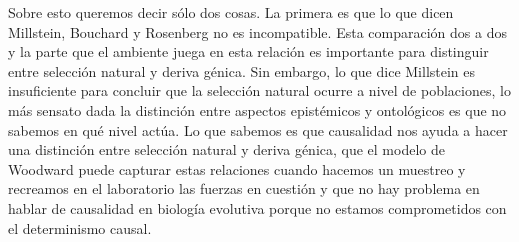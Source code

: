 Sobre esto queremos decir sólo dos cosas. La primera es que lo que dicen Millstein, Bouchard y Rosenberg no es incompatible. Esta comparación dos a dos y la parte que el ambiente juega en esta relación es importante para distinguir entre selección natural y deriva génica. Sin embargo, lo que dice Millstein es insuficiente para concluir que la selección natural ocurre a nivel de poblaciones, lo más sensato dada la distinción entre aspectos epistémicos y ontológicos es que no sabemos en qué nivel actúa. Lo que sabemos es que causalidad nos ayuda a hacer una distinción entre selección natural y deriva génica, que el modelo de Woodward puede capturar estas relaciones cuando hacemos un muestreo y recreamos en el laboratorio las fuerzas en cuestión y que no hay problema en hablar de causalidad en biología evolutiva porque no estamos comprometidos con el determinismo causal.


